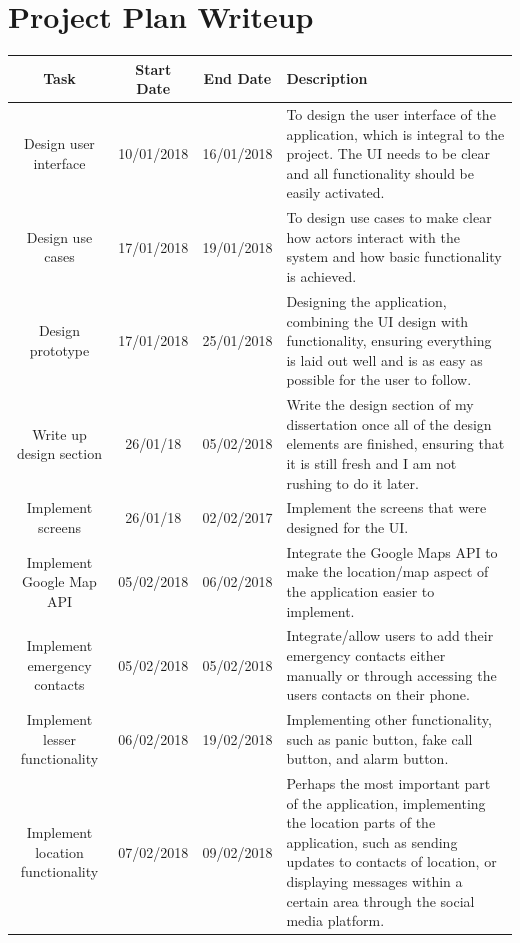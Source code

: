 \documentclass[a4paper]{report}
\begin{document}
\section{Project Plan Writeup}
\label{sec:ProjectPlanWriteup}
\begin{center}
	\begin{longtable} {|c|c|c|p{60mm}|}
		\hline
		Task & Start Date & End Date & Description \\
		\hline 
		Design user interface & 10/01/2018 & 16/01/2018 & To design the user interface of the application, which is integral to the project. The UI needs to be clear and all functionality should be easily activated. \\
		\hline
		Design use cases &  17/01/2018 & 19/01/2018 & To design use cases to make clear how actors interact with the system and how basic functionality is achieved.\\
		\hline 
		Design prototype & 17/01/2018 & 25/01/2018 & Designing the application, combining the UI design with functionality, ensuring everything is laid out well and is as easy as possible for the user to follow. \\
		\hline 
		Write up design section & 26/01/18 & 05/02/2018 & Write the design section of my dissertation once all of the design elements are finished, ensuring that it is still fresh and I am not rushing to do it later. \\
		\hline 
		Implement screens & 26/01/18 & 02/02/2017 & Implement the screens that were designed for the UI.\\
		\hline 
		Implement Google Map API & 05/02/2018 & 06/02/2018 & Integrate the Google Maps API to make the location/map aspect of the application easier to implement. \\
		\hline
		Implement emergency contacts & 05/02/2018 & 05/02/2018 & Integrate/allow users to add their emergency contacts either manually or through accessing the users contacts on their phone. \\
		\hline
		Implement lesser functionality & 06/02/2018 & 19/02/2018 & Implementing other functionality, such as panic button, fake call button, and alarm button. \\
		\hline
		Implement location functionality & 07/02/2018 & 09/02/2018 & Perhaps the most important part of the application, implementing the location parts of the application, such as sending updates to contacts of location, or displaying messages within a certain area through the social media platform. \\
		\hline 

\end{longtable}
\end{center}
\end{document}
